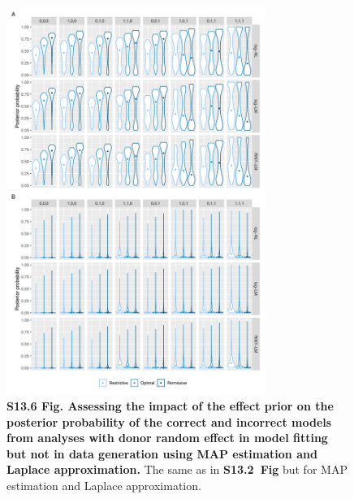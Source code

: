 \documentclass[11pt]{article}
\newcommand{\sfigppeffecttwo}{\textbf{S13.2~Fig}\xspace}
\begin{document}
\begin{figure}[!ht]
\begin{center}
  \includegraphics[width=0.75\textwidth]{png/sim_vln_effect_map_lap_noranef_ranef.png}
\end{center}  
\caption{
  {\bf
    S13.6 Fig.
    Assessing the impact of the effect prior on the posterior probability of the correct and incorrect models from analyses with donor random effect in model fitting but not in data generation using MAP estimation and Laplace approximation.}
The same as in \sfigppeffecttwo but for MAP estimation and Laplace approximation.
}
\label{s-fig:sim-effect-map-noranef-ranef}
\end{figure}
\end{document}
